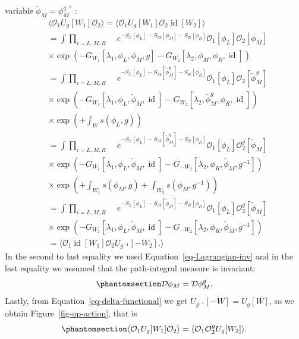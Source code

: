 \documentclass[
  letterpaper,
  DIV=11,
  numbers=noendperiod]{scrreport}
\DeclareMathOperator{\id}{id}
\begin{document}
variable \(\widetilde{\phi}_M = \phi_M^{g^{-1}}\) : \[
\begin{aligned}
    &\langle \mathcal{O}_1 U_g[W_1] \mathcal{O}_2 \rangle = \langle \mathcal{O}_1 U_g[W_1] \mathcal{O}_2 \id[W_2] \rangle \\
     &= \int \prod_{i=L,M,R}\mathop{\mathcal{D}^{M_i}\phi_i} \mathop{\prod_{a=1,2}\mathcal{D}^{W_a} \lambda_a} e^{-S_L[\phi_L]-S_M[\phi_M]-S_R[\phi_R]}\mathcal{O}_1[\phi_L] \mathcal{O}_2[\phi_M]
     \\ 
     &\times \exp\left(-G_{W_1}[\lambda_1,\phi_L,\phi_M,g]-G_{W_2}[\lambda_2,\phi_M,\phi_R,\id]\right)\\
     &= \int \prod_{i=L,M,R}\mathop{\mathcal{D}^{M_i}\phi_i} \mathop{\prod_{a=1,2}\mathcal{D}^{W_a}\lambda_a} e^{-S_L[\phi_L]-S_M[\widetilde\phi_M^g]-S_R[\phi_R]}\mathcal{O}_1[\phi_L] \mathcal{O}_2[\widetilde\phi_M^g]
     \\ 
     &\times \exp\left(-G_{W_1}[\lambda_1,\phi_L,\widetilde\phi_M,\id]-G_{W_2}[\lambda_2,\widetilde{\phi}_M^g,\phi_R,\id]\right)\\ 
     &\times \exp\left( + \int_W s(\phi_L,g) \right)\\ 
     &= \int \prod_{i=L,M,R}\mathop{\mathcal{D}^{M_i}\phi_i} \mathop{\prod_{a=1,2}\mathcal{D}^{W_a}\lambda_a} e^{-S_L[\phi_L]-S_M[\widetilde\phi_M^g]-S_R[\phi_R]}\mathcal{O}_1[\phi_L] \mathcal{O}_2^g[\widetilde\phi_M]
     \\ 
     &\times \exp\left(-G_{W_1}[\lambda_1,\phi_L,\widetilde\phi_M,\id]-G_{-W_2}[\lambda_2,\phi_R,\widetilde{\phi}_M,g^{-1}]\right)\\ 
     &\times \exp\left( + \int_{W_1} s(\phi_M,g) + \int_{W_2} s(\phi_M,g^{-1})  \right)\\
     &= \int \prod_{i=L,M,R}\mathop{\mathcal{D}^{M_i}\phi_i} \mathop{\prod_{a=1,2}\mathcal{D}^{W_a}\lambda_a} e^{-S_L[\phi_L]-S_M[\widetilde\phi_M]-S_R[\phi_R]}\mathcal{O}_1[\phi_L] \mathcal{O}_2^g[\widetilde\phi_M]
     \\ 
     &\times \exp\left(-G_{W_1}[\lambda_1,\phi_L,\widetilde\phi_M,\id]-G_{-W_2}[\lambda_2,\phi_R,\widetilde{\phi}_M,g^{-1}]\right)\\
     &= \langle \mathcal{O}_1 \id[W_1] \mathcal{O}_2 U_{g^{-1}}[-W_2]. \rangle
\end{aligned}
\] In the second to last equality we used
Equation~\ref{eq-Lagrangian-inv} and in the last equality we assumed
that the path-integral measure is invariant:
\begin{equation}\phantomsection\label{eq-measure-inv}{\mathcal{D}\phi_M = \mathcal{D}\phi_M^g.
}\end{equation} Lastly, from Equation~\ref{eq-delta-functional} we get
\(U_{g^{-1}}[-W] = U_g[W]\), so we obtain Figure~\ref{fig-op-action},
that is \begin{equation}\phantomsection\label{eq-sym-op-act}{
\langle \mathcal{O}_1 U_g[W_1] \mathcal{O}_2 \rangle = \langle \mathcal{O}_1 \mathcal{O}_2^g U_g[W_2] \rangle.
}\end{equation}
\end{document}
